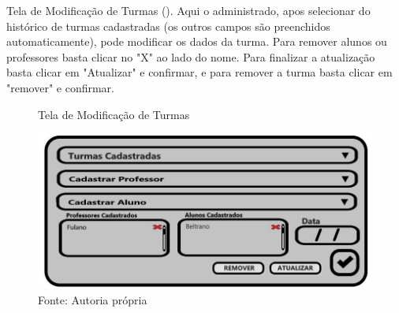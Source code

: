 \documentclass{utfpr-pg}
\begin{document}
        Tela de Modificação de Turmas (). Aqui o administrado, apos selecionar do histórico de turmas cadastradas (os outros campos são preenchidos automaticamente), pode modificar os dados da turma. Para remover alunos ou professores basta clicar no "X" ao lado do nome. Para finalizar a atualização basta clicar em "Atualizar" e confirmar, e para remover a turma basta clicar em "remover" e confirmar.
        \begin{figure}[H]
            \centering
            \captionsetup{width=0.9\textwidth}
            \caption{Tela de Modificação de Turmas}
            \includegraphics[width=\linewidth]{fotos/15.jpg}
            \caption*{Fonte: Autoria própria}
            \label{fig:15}
        \end{figure}
        
\end{document}
